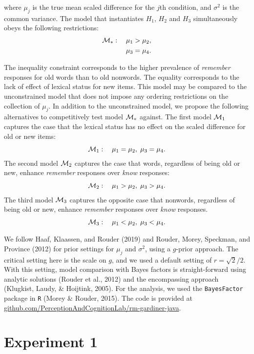 \documentclass[english,,man,floatsintext]{apa6}
\begin{document}
where \(\mu_j\) is the true mean scaled difference for the \(j\)th condition, and \(\sigma^2\) is the common variance. The model that instantiates \(H_1\), \(H_2\) and \(H_3\) simultaneously obeys the following restrictions:
\[
\begin{aligned}
{\cal M}_*: \quad \mu_1 &> \mu_2,\\
\mu_3 &= \mu_4.\\
\end{aligned}
\]

The inequality constraint corresponds to the higher prevalence of \emph{remember} responses for old words than to old nonwords. The equality corresponds to the lack of effect of lexical status for new items. This model may be compared to the unconstrained model that does not impose any ordering restrictions on the collection of \(\mu_j\). In addition to the unconstrained model, we propose the following alternatives to competitively test model \({\cal M}_*\) against. The first model \({\cal M}_1\) captures the case that the lexical status has no effect on the scaled difference for old or new items:
\[
{\cal M}_1: \quad \mu_1 = \mu_2, \; \mu_3=\mu_4.
\]
The second model \({\cal M}_2\) captures the case that words, regardless of being old or new, enhance \emph{remember} responses over \emph{know} responses:
\[
{\cal M}_2: \quad \mu_1 > \mu_2, \; \mu_3 > \mu_4.
\]
The third model \({\cal M}_3\) captures the opposite case that nonwords, regardless of being old or new, enhance \emph{remember} responses over \emph{know} responses.
\[
{\cal M}_3: \quad \mu_1 < \mu_2, \; \mu_3 < \mu_4.
\]

We follow Haaf, Klaassen, and Rouder (2019) and Rouder, Morey, Speckman, and Province (2012) for prior settings for \(\mu_j\) and \(\sigma^2\), using a \(g\)-prior approach. The critical setting here is the scale on \(g\), and we used a default setting of \(r = \sqrt{2}/2\). With this setting, model comparison with Bayes factors is straight-forward using analytic solutions (Rouder et al., 2012) and the encompassing approach (Klugkist, Laudy, \& Hoijtink, 2005). For the analysis, we used the \texttt{BayesFactor} package in \texttt{R} (Morey \& Rouder, 2015). The code is provided at \href{https://github.com/PerceptionAndCognitionLab/rm-gardiner-java}{github.com/PerceptionAndCognitionLab/rm-gardiner-java}.

\hypertarget{experiment-1}{%
\section{Experiment 1}\label{experiment-1}}
\end{document}
